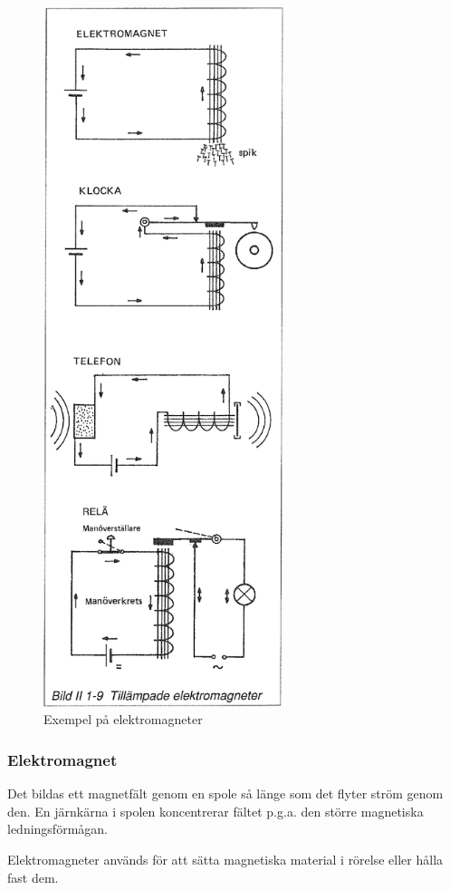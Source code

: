 \begin{figure}[h]
\begin{center}
\includegraphics[width=7cm]{images/bild_2_1-09}
\caption{Exempel på elektromagneter}
\label{fig:BildII1-9}
\end{center}
\end{figure}


\subsubsection{Elektromagnet}
Det bildas ett magnetfält genom en spole så länge som det flyter ström genom
den. En järnkärna i spolen koncentrerar fältet p.g.a. den större magnetiska
ledningsförmågan.

Elektromagneter används för att sätta magnetiska material i rörelse eller hålla
fast dem.

